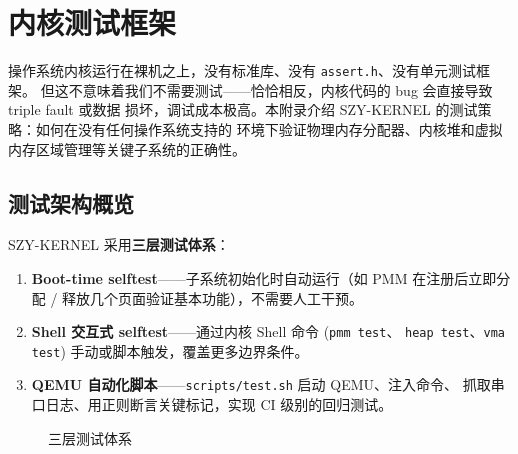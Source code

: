 \chapter{内核测试框架}
\label{ch:appendix-testing}

操作系统内核运行在裸机之上，没有标准库、没有 \texttt{assert.h}、没有单元测试框架。
但这不意味着我们不需要测试——恰恰相反，内核代码的 bug 会直接导致 triple fault 或数据
损坏，调试成本极高。本附录介绍 SZY-KERNEL 的测试策略：如何在没有任何操作系统支持的
环境下验证物理内存分配器、内核堆和虚拟内存区域管理等关键子系统的正确性。

\section{测试架构概览}

SZY-KERNEL 采用\textbf{三层测试体系}：

\begin{enumerate}
  \item \textbf{Boot-time selftest}——子系统初始化时自动运行（如 PMM 在注册后立即分配
    / 释放几个页面验证基本功能），不需要人工干预。
  \item \textbf{Shell 交互式 selftest}——通过内核 Shell 命令 (\texttt{pmm test}、
    \texttt{heap test}、\texttt{vma test}) 手动或脚本触发，覆盖更多边界条件。
  \item \textbf{QEMU 自动化脚本}——\texttt{scripts/test.sh} 启动 QEMU、注入命令、
    抓取串口日志、用正则断言关键标记，实现 CI 级别的回归测试。
\end{enumerate}

\begin{figure}[H]
  \centering
  \caption{三层测试体系}
  \label{fig:test-layers}
\end{figure}

